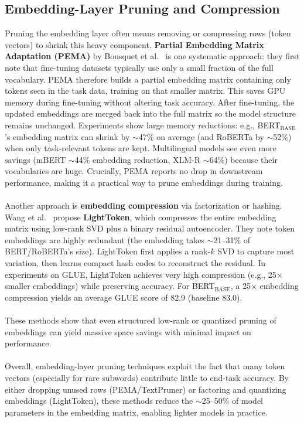 \documentclass[twocolumn]{article}
\begin{document}
\subsection{Embedding-Layer Pruning and Compression}

Pruning the embedding layer often means removing or compressing rows (token vectors) to shrink this heavy component. \textbf{Partial Embedding Matrix Adaptation (PEMA)} by Bousquet et al.~\cite{bousquet2023pema} is one systematic approach: they first note that fine-tuning datasets typically use only a small fraction of the full vocabulary. PEMA therefore builds a partial embedding matrix containing only tokens seen in the task data, training on that smaller matrix. This saves GPU memory during fine-tuning without altering task accuracy. After fine-tuning, the updated embeddings are merged back into the full matrix so the model structure remains unchanged. Experiments show large memory reductions: e.g., BERT$_{\text{BASE}}$'s embedding matrix can shrink by $\sim$47\% on average (and RoBERTa by $\sim$52\%) when only task-relevant tokens are kept. Multilingual models see even more savings (mBERT $\sim$44\% embedding reduction, XLM-R $\sim$64\%) because their vocabularies are huge. Crucially, PEMA reports no drop in downstream performance, making it a practical way to prune embeddings during training.
\\ \\
Another approach is \textbf{embedding compression} via factorization or hashing. Wang et al.~\cite{wang2023lighttoken} propose \textbf{LightToken}, which compresses the entire embedding matrix using low-rank SVD plus a binary residual autoencoder. They note token embeddings are highly redundant (the embedding takes $\sim$21--31\% of BERT/RoBERTa's size). LightToken first applies a rank-$k$ SVD to capture most variation, then learns compact hash codes to reconstruct the residual. In experiments on GLUE, LightToken achieves very high compression (e.g., 25$\times$ smaller embeddings) while preserving accuracy. For BERT$_{\text{BASE}}$, a 25$\times$ embedding compression yields an average GLUE score of 82.9 (baseline 83.0).
\\ \\
These methods show that even structured low-rank or quantized pruning of embeddings can yield massive space savings with minimal impact on performance.
\\ \\
Overall, embedding-layer pruning techniques exploit the fact that many token vectors (especially for rare subwords) contribute little to end-task accuracy. By either dropping unused rows (PEMA/TextPruner) or factoring and quantizing embeddings (LightToken), these methods reduce the $\sim$25--50\% of model parameters in the embedding matrix, enabling lighter models in practice.
\end{document}
